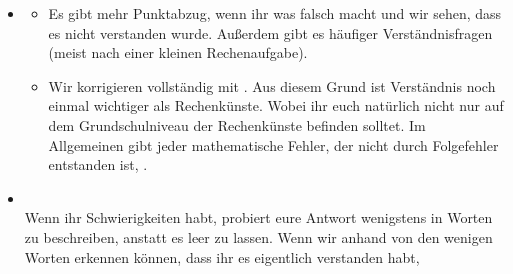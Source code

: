 \begin{itemize}
\begin{itemize}
		\item Es werden  1-2 Aufgaben drankommen, die in der Kategorie der grafischen Aufgaben eingeordnet werden kann. Also Informationen aus einer Grafik auslesen, selber etwas in eine Grafik einzeichnen, anhand einer argumentieren oder oder oder \dots
		
		\item Die letzte Aufgabe der Klausur ist (immer) eine . Hierbei gilt, dass man in Java oder Java-ähnlichem Pseudocode geschrieben werden muss. Solange ihr nicht von irgendwelchen Packages ausgeht, die euch alle Funktionalitäten abnehmen und euer Code verständlich ist, alles super!%
		
		\item Es gibt immer 2-3 Teilaufgaben, die sehr schwierig sind bzw.  behandelt worden sind (und die ich vermutlich ohne Üben auch nicht schaffen würde). Macht euch darüber keine Sorge, ohne diese kann man immer noch eine 1,3 schreiben. \Cooley
	\end{itemize}
	
	\item {}
	\begin{itemize}
		\item Es gibt mehr Punktabzug, wenn ihr was falsch macht und wir sehen, dass es nicht verstanden wurde. Außerdem gibt es häufiger Verständnisfragen (meist nach einer kleinen Rechenaufgabe).
		\item Wir korrigieren vollständig mit . Aus diesem Grund ist Verständnis noch einmal wichtiger als Rechenkünste. Wobei ihr euch natürlich nicht nur auf dem Grundschulniveau der Rechenkünste befinden solltet. Im Allgemeinen gibt jeder mathematische Fehler, der nicht durch Folgefehler entstanden ist, .
	\end{itemize}
	
	\item {}\\
	Wenn ihr Schwierigkeiten habt, probiert eure Antwort wenigstens in Worten zu beschreiben, anstatt es leer zu lassen. Wenn wir anhand von den wenigen Worten erkennen können, dass ihr es eigentlich verstanden habt, 
	

\end{itemize}
